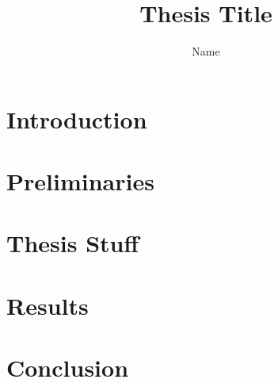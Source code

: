 \documentclass[12pt]{report}
\title{Thesis Title}
\author{Name}
\numberwithin{equation}{mycounter} %
\numberwithin{table}{mycounter}
\theoremstyle{plain}
\theoremstyle{definition}
\theoremstyle{remark}
\theoremstyle{style1}
\begin{document}







\tableofcontents
\listoffigures
\listoftables

\chapter{Introduction}


\chapter{Preliminaries}


\chapter{Thesis Stuff}


\chapter{Results}


\chapter{Conclusion}


\nocite{*}
\printbibliography[title={References}, heading=bibintoc]
\end{document}

